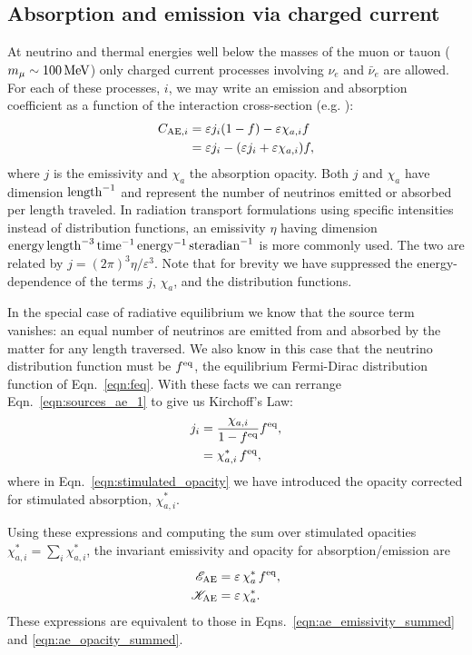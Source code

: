 \documentclass[aps,floatfix,prd,superscriptaddress,twocolumn]{revtex4-1}
\newcommand{\todo}[1]{\marginpar{\tiny{\textcolor{red}{#1}}}}
\begin{document}
\subsection{Absorption and emission via charged current}
\label{ssec:sources_ae}
At neutrino and thermal energies well below the masses of the muon or tauon
($m_{\mu}\sim100\,{\rm MeV}$)
only charged current processes involving $\nu_e$ and $\bar{\nu}_e$ are allowed.
For each of these processes, $i$, we may write an emission and absorption
coefficient as a function of the interaction cross-section
(e.g. \cite[Eqn.~A5]{brue1985-core_collapse}):
\todo{explain Fermi-blocking}
\begin{align}
  \label{eqn:sources_ae_1}
  C_{{\rm AE},i}
  &= \varepsilon j_i (1-f) - \varepsilon \chi_{a,i} f \\
  \label{eqn:sources_ae_2}
  &= \varepsilon j_i - (\varepsilon j_i+\varepsilon \chi_{a,i}) f,
\end{align}
where $j$ is the emissivity and $\chi_a$ the absorption opacity.
Both $j$ and $\chi_a$ have dimension ${\rm length}^{-1}$ and represent the
number of neutrinos emitted or absorbed per length traveled.
In radiation transport formulations using specific intensities instead of
distribution functions, an emissivity $\eta$ having dimension
${\rm energy}\,{\rm length}^{-3}\,{\rm time}^{-1}\,{\rm energy}^{-1}\,{\rm steradian}^{-1}$
is more commonly used.
The two are related by $j=(2\pi)^3\eta/\varepsilon^3$.
Note that for brevity we have suppressed the energy-dependence of
the terms $j$, $\chi_a$, and the distribution functions.

In the special case of radiative equilibrium we know that the source
term vanishes: an equal number of neutrinos are emitted from
and absorbed by the matter for any length traversed.
We also know in this case that the neutrino distribution function must be
$f^{\rm eq}$, the equilibrium Fermi-Dirac distribution function of
Eqn.~\ref{eqn:feq}.
With these facts we can rerrange Eqn.~\ref{eqn:sources_ae_1} to give us
Kirchoff's Law:
\begin{align}
  \label{eqn:kirchoffs_law}
  j_i &= \frac{\chi_{a,i}}{1-f^{\rm eq}}f^{\rm eq}, \\
  \label{eqn:stimulated_opacity}
  &= \chi^*_{a,i}\,f^{\rm eq},
\end{align}
where in Eqn.~\ref{eqn:stimulated_opacity} we have introduced the opacity
corrected for stimulated absorption, $\chi^*_{a,i}$.

Using these expressions and computing the sum over stimulated opacities
$\chi^*_{a,i}=\sum_i \chi^*_{a,i}$,
the invariant emissivity and opacity for absorption/emission are
\begin{align}
  \label{eqn:ae_emissivity_summed_2}
  \mathscr{E}_{{\rm AE}} &= \varepsilon \, \chi^*_a \, f^{\rm eq}, \\
  \label{eqn:ae_opacity_summed_2}
  \mathscr{K}_{{\rm AE}} &= \varepsilon \, \chi^*_a.
\end{align}
These expressions are equivalent to those in
Eqns.~\ref{eqn:ae_emissivity_summed} and \ref{eqn:ae_opacity_summed}.
\end{document}
